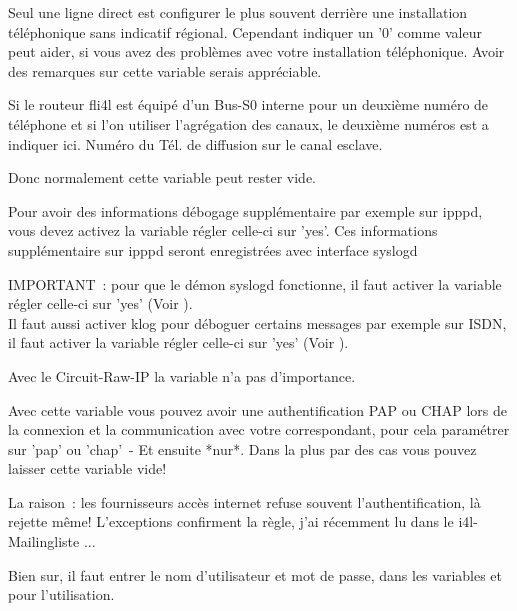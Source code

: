 \begin{description}
  Seul une ligne direct est configurer le plus souvent derrière une installation
  téléphonique sans indicatif régional. Cependant indiquer un '0' comme valeur peut
  aider, si vous avez des problèmes avec votre installation téléphonique. Avoir des
  remarques sur cette variable serais appréciable.


  Si le routeur fli4l est équipé d'un Bus-S0 interne pour un deuxième numéro de
  téléphone et si l'on utiliser l'agrégation des canaux, le deuxième numéros est
  a indiquer ici. Numéro du Tél. de diffusion sur le canal esclave.

  Donc normalement cette variable peut rester vide.


  Pour avoir des informations débogage supplémentaire par exemple sur ipppd, vous devez
  activez la variable  régler celle-ci sur 'yes'.
  Ces informations supplémentaire sur ipppd seront enregistrées avec interface syslogd

  IMPORTANT~: pour que le démon syslogd fonctionne, il faut activer la variable
   régler celle-ci sur 'yes'
  (Voir ).\\
  Il faut aussi activer klog pour déboguer certains messages par exemple sur ISDN,
  il faut activer la variable  régler celle-ci sur 'yes'
  (Voir ).

  Avec le Circuit-Raw-IP la variable  n'a pas d'importance.


  Avec cette variable vous pouvez avoir une authentification PAP ou CHAP lors de la
  connexion et la communication avec votre correspondant, pour cela paramétrer
   sur 'pap' ou 'chap'~- Et ensuite *nur*. Dans la
  plus par des cas vous pouvez laisser cette variable vide!

  La raison~: les fournisseurs accès internet refuse souvent l'authentification,
  là rejette même! L'exceptions confirment la règle, j'ai récemment lu dans
  le i4l-Mailingliste ...

  Bien sur, il faut entrer le nom d'utilisateur et mot de passe, dans les variables
   et  
  pour l'utilisation.


\end{description}
